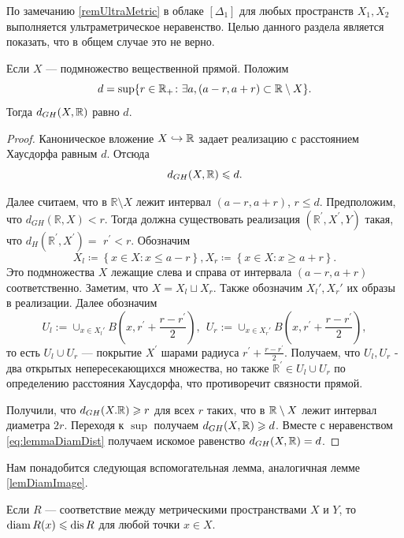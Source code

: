 По замечанию \ref{remUltraMetric} в облаке \( [\Delta _1] \) для
любых пространств \( X_1, X_2 \) выполняется ультраметрическое
неравенство. Целью данного раздела является показать, что в общем
случае это не верно.
\begin{lemma}
  Если $X$ --- подмножество вещественной прямой. Положим
  \[
    d =\sup\{r\in \mathbb R_+ \colon \exists a, (a-r, a+r)\subset \mathbb R
    \setminus X \}.
  \]
  Тогда \( d_{GH}(X,\mathbb R) \) равно \( d \).
  \label{lemmaDiamDist}
\end{lemma}
\begin{proof} Каноническое вложение \( X \hookrightarrow \mathbb R \) задает
  реализацию с расстоянием Хаусдорфа равным \( d \).
  Отсюда
  \begin{equation}
    d_{GH}(X, \mathbb R) \leqslant d.
    \label{eq:lemmaDiamDist}
  \end{equation}

  Далее считаем, что в $\mathbb{R} \setminus X$ лежит
  интервал $(a-r, a+r)$, \( r \le d \).
  Предположим, что $d_{G H}(\mathbb{R}, X)<r$. Тогда должна
  существовать реализация
  $\left(\mathbb{R}^{\prime}, X^{\prime}, Y\right)$ такая, что
  $d_H\left(\mathbb{R}^{\prime},
  X^{\prime}\right)=$ $r^{\prime}<r$. Обозначим
  \[
    X_l \coloneqq \left\{x\in X \colon x \le a-r\right\},
    X_r \coloneqq \left\{x\in X \colon x \ge a+r\right\}.
  \]
  Это подмножества \( X \) лежащие слева и справа от интервала \(
  (a-r, a+r) \) соответственно. Заметим, что \( X = X_l \sqcup X_r
  \). Также обозначим \( X_l', X_r'\) их образы в реализации.
  Далее обозначим \[U_l:=\cup_{x \in
    X_l'} B\left(x,
    r^{\prime}+\frac{r-r^{\prime}}{2}\right),~~ U_r:=\cup_{x \in
    X_r'} B\left(x,
  r^{\prime}+\frac{r-r^{\prime}}{2}\right),\]
  то есть $U_l \cup U_r$ --- покрытие $X^{\prime}$ шарами радиуса
  $r^\prime + \frac{r-r^{\prime}}{2}$.
  Получаем, что $U_l, U_r$ - два открытых непересекающихся множества,
  но также $\mathbb{R}^{\prime} \in U_l \cup U_r$ по определению
  расстояния Хаусдорфа, что противоречит
  связности прямой.

  Получили, что \( d_{GH}(X. \mathbb R) \geqslant r \) для всех \( r \) таких, что
  в \( \mathbb R \setminus X \) лежит интервал диаметра \( 2r \). Переходя к
  \( \sup \) получаем \( d_{GH}(X, \mathbb R) \geqslant d \). Вместе с
  неравенством \ref{eq:lemmaDiamDist} получаем искомое равенство \(
  d_{GH}(X, \mathbb R) = d\).
\end{proof}
Нам понадобится следующая вспомогательная лемма, аналогичная лемме
\ref{lemDiamImage}.
\begin{lemma}
  Если \( R \) --- соответствие между метрическими пространствами \( X
  \) и \( Y \), то \( \operatorname{diam} R(x) \leqslant \operatorname{dis} R \) для любой точки \( x\in X \).
\end{lemma}

